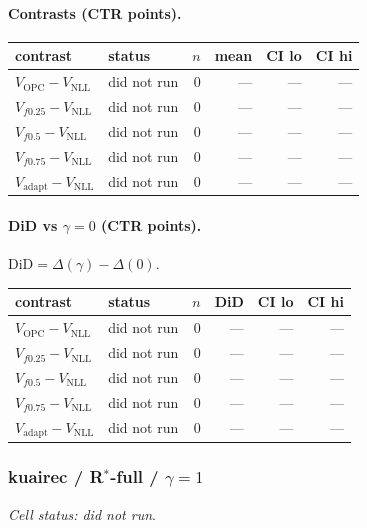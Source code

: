 \documentclass[10pt,a4paper]{article}
\begin{document}
\paragraph{Contrasts (CTR points).}
{\centering\small\begin{tabular}{llrrrr}
\toprule contrast & status & $n$ & mean & CI lo & CI hi \\
\midrule
$V_{\mathrm{OPC}}-V_{\mathrm{NLL}}$ & did not run & 0 & --- & --- & --- \\
$V_{f0.25}-V_{\mathrm{NLL}}$ & did not run & 0 & --- & --- & --- \\
$V_{f0.5}-V_{\mathrm{NLL}}$ & did not run & 0 & --- & --- & --- \\
$V_{f0.75}-V_{\mathrm{NLL}}$ & did not run & 0 & --- & --- & --- \\
$V_{\mathrm{adapt}}-V_{\mathrm{NLL}}$ & did not run & 0 & --- & --- & --- \\
\bottomrule\end{tabular}\par}
\paragraph{DiD vs $\gamma=0$ (CTR points).} $\mathrm{DiD}=\Delta(\gamma)-\Delta(0)$.
{\centering\small\begin{tabular}{llrrrr}
\toprule contrast & status & $n$ & DiD & CI lo & CI hi \\
\midrule
$V_{\mathrm{OPC}}-V_{\mathrm{NLL}}$ & did not run & 0 & --- & --- & --- \\
$V_{f0.25}-V_{\mathrm{NLL}}$ & did not run & 0 & --- & --- & --- \\
$V_{f0.5}-V_{\mathrm{NLL}}$ & did not run & 0 & --- & --- & --- \\
$V_{f0.75}-V_{\mathrm{NLL}}$ & did not run & 0 & --- & --- & --- \\
$V_{\mathrm{adapt}}-V_{\mathrm{NLL}}$ & did not run & 0 & --- & --- & --- \\
\bottomrule\end{tabular}\par}
\bigskip
\subsubsection{kuairec / R$^*$-full / $\gamma=1$}
\emph{Cell status: did not run}.
\end{document}
